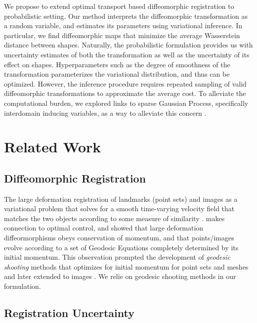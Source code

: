 \documentclass{6838publ}
\begin{document}
We propose to extend optimal transport based diffeomorphic registration to probabilistic setting. Our method interprets the diffeomorphic transformation as a random variable, and estimates its parameters using variational inference. In particular, we find diffeomorphic maps that minimize the average Wasserstein distance between shapes. Naturally, the probabilistic formulation provides us with uncertainty estimates of both the transformation as well as the uncertainty of its effect on shapes. Hyperparameters such as the degree of smoothness of the transformation parameterizes the variational distribution, and thus can be optimized. However, the inference procedure requires repeated sampling of valid diffeomorphic transformations to approximate the average cost. To alleviate the computational burden, we explored links to sparse Gaussian Process, specifically interdomain inducing variables, as a way to alleviate this concern \cite{figueiras-vidalInterdomainGaussianProcesses2009a}.


\section{Related Work}

\subsection{Diffeomorphic Registration}

The large deformation registration of landmarks (point sets) and images as a variational problem that solves for a smooth time-varying velocity field that matches the two objects according to some measure of similarity \cite{joshiLandmarkMatchingLarge2000,begComputingLargeDeformation2005}. \cite{millerGeodesicShootingComputational2006,vialardDiffeomorphic3DImage2012} makes connection to optimal control, and showed that large deformation diffeormorphisms obeys conservation of momentum, and that points/images evolve according to a set of Geodesic Equations completely determined by its initial momentum. This observation prompted the development of \textit{geodesic shooting} methods that optimizes for initial momentum for point sets and meshes \cite{vaillantStatisticsDiffeomorphismsTangent2004,allassonniereGeodesicShootingDiffeomorphic2005} and later extended to images \cite{vialardDiffeomorphic3DImage2012}. We relie on geodesic shooting methods in our formulation.


\subsection{Registration Uncertainty}
\end{document}
